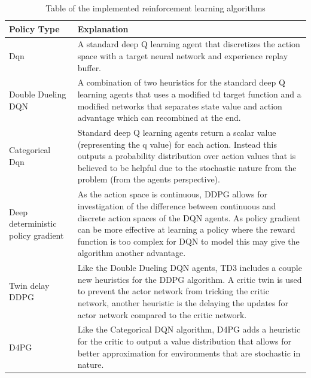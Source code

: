 \begin{table}
    \centering
    \begin{tabular}{|p{5cm}|p{10cm}|} \hline
        Policy Type & Explanation \\ \hline
        Dqn~\citep{mnih2015humanlevel} & A standard deep Q learning agent that discretizes the action space with a
            target neural network and experience replay buffer. \\ \hline
        Double Dueling DQN~\citep{doubledqn, duelingdqn} & A combination of two heuristics for the standard deep Q
            learning agents that uses a modified td target function and a modified networks that separates state value
            and action advantage which can recombined at the end. \\ \hline
        Categorical Dqn~\citep{distributional_dqn} & Standard deep Q learning agents return a scalar value
            (representing the q value) for each action. Instead this outputs a probability distribution over action
            values that is believed to be helpful due to the stochastic nature from the problem (from the agents
            perspective). \\ \hline
        Deep deterministic policy gradient~\citep{ddpg} & As the action space is continuous, DDPG allows for
            investigation of the difference between continuous and discrete action spaces of the DQN agents. As policy
            gradient can be more effective at learning a policy where the reward function is too complex for DQN to
            model this may give the algorithm another advantage. \\ \hline
        Twin delay DDPG~\citep{td3} & Like the Double Dueling DQN agents, TD3 includes a couple new heuristics for the
            DDPG algorithm. A critic twin is used to prevent the actor network from tricking the critic network, another
            heuristic is the delaying the updates for actor network compared to the critic network.\\ \hline
        D4PG~\citep{d4pg} & Like the Categorical DQN algorithm, D4PG adds a heuristic for the critic to output a
            value distribution that allows for better approximation for environments that are stochastic in nature.
            \\ \hline
    \end{tabular}
    \caption{Table of the implemented reinforcement learning algorithms}
    \label{tab:reinforcement_learning_algorithms}
\end{table}

